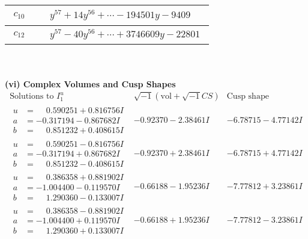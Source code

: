 \documentclass[1p]{elsarticle_modified}
\theoremstyle{definition}
\newcommand{\I}{\sqrt{-1}}
\begin{document}
\begin{tabular}{m{50pt}|m{274pt}}
\hline $$\begin{aligned}c_{10}\end{aligned}$$&$\begin{aligned}
&y^{57}+14 y^{56}+\cdots-194501 y-9409
\end{aligned}$\\
\hline $$\begin{aligned}c_{12}\end{aligned}$$&$\begin{aligned}
&y^{57}-40 y^{56}+\cdots+3746609 y-22801
\end{aligned}$\\
\hline
\end{tabular}\\~\\
\newpage\flushleft \textbf{(vi) Complex Volumes and Cusp Shapes}
$$\begin{array}{c|c|c}  
\text{Solutions to }I^u_{1}& \I (\text{vol} + \sqrt{-1}CS) & \text{Cusp shape}\\
 \hline 
\begin{aligned}
u &= \phantom{-}0.590251 + 0.816756 I \\
a &= -0.317194 - 0.867682 I \\
b &= \phantom{-}0.851232 + 0.408615 I\end{aligned}
 & -0.92370 - 2.38461 I & -6.78715 - 4.77142 I \\ \hline\begin{aligned}
u &= \phantom{-}0.590251 - 0.816756 I \\
a &= -0.317194 + 0.867682 I \\
b &= \phantom{-}0.851232 - 0.408615 I\end{aligned}
 & -0.92370 + 2.38461 I & -6.78715 + 4.77142 I \\ \hline\begin{aligned}
u &= \phantom{-}0.386358 + 0.881902 I \\
a &= -1.004400 - 0.119570 I \\
b &= \phantom{-}1.290360 - 0.133007 I\end{aligned}
 & -0.66188 - 1.95236 I & -7.77812 + 3.23861 I \\ \hline\begin{aligned}
u &= \phantom{-}0.386358 - 0.881902 I \\
a &= -1.004400 + 0.119570 I \\
b &= \phantom{-}1.290360 + 0.133007 I\end{aligned}
 & -0.66188 + 1.95236 I & -7.77812 - 3.23861 I \\ \hline\begin{aligned}

\end{aligned}
\end{array}$$
\end{document}
